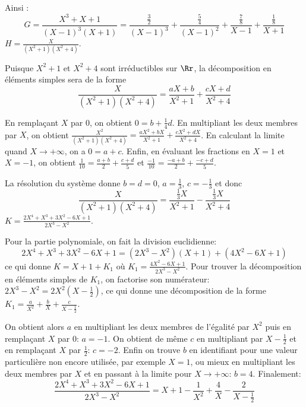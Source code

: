 {\begin{enumerate}
{Ainsi :
$$G = \frac{X^3+X+1}{(X-1)^3(X+1)} = \frac{\tfrac32}{(X-1)^3} + \frac{\tfrac54}{(X-1)^2} 
+ \frac{\tfrac78}{X-1}  + \frac{\tfrac18}{X+1}$$
$H=\frac{X}{(X^2+1)(X^2+4)}$.

Puisque $X^2+1$ et $X^2+4$ sont irréductibles sur $\Rr$, la décomposition en éléments simples sera de la forme 
$$\frac{X}{(X^2+1)(X^2+4)} = \frac{aX+b}{X^2+1} + \frac{cX+d}{X^2+4}$$

  \begin{itemize}
En remplaçant $X$ par $0$, on obtient $0=b+\frac{1}{4}d$.
En multipliant les deux membres par $X$, on obtient 
    $\frac{X^2}{(X^2+1)(X^2+4)} = \frac{aX^2+bX}{X^2+1} + \frac{cX^2+dX}{X^2+4}$.
    En calculant la limite quand $X\to +\infty$, on a $0=a+c$.
Enfin, en évaluant les fractions en $X=1$ et $X=-1$, 
    on obtient $\frac{1}{10}=\frac{a+b}{2}+\frac{c+d}{5}$ et 
    $\frac{-1}{10}=\frac{-a+b}{2}+\frac{-c+d}{5}$.
  \end{itemize}

La résolution du système donne $b=d=0$, $a=\frac{1}{3}$, $c=-\frac{1}{3}$ et donc 
$$\frac{X}{(X^2+1)(X^2+4)} = \frac{\frac{1}{3}X}{X^2+1} - \frac{\frac{1}{3}X}{X^2+4}$$
$K=\frac{2X^4+X^3+3X^2-6X+1}{2X^3-X^2}$.

Pour la partie polynomiale, on fait la division euclidienne:
$$2X^4+X^3+3X^2-6X+1=(2X^3-X^2)(X+1)+(4X^2-6X+1)$$ 
ce qui donne 
$K=X+1+K_1$ où $K_1=\frac{4X^2-6X+1}{2X^3-X^2}$.
Pour trouver la décomposition en éléments simples de $K_1$, on factorise son numérateur: 
$2X^3-X^2=2X^2(X-\frac{1}{2})$, ce qui donne une décomposition de la forme
$K_1=\frac{a}{X^2}+\frac{b}{X}+\frac{c}{X-\frac{1}{2}}$.

On obtient alors $a$ en multipliant les deux membres de l'égalité par
$X^2$ puis en remplaçant $X$ par 0: $a=-1$. On obtient de
m\^eme $c$ en multipliant par $X-\frac{1}{2}$ et en remplaçant $X$
par $\frac{1}{2}$: $c=-2$. Enfin on trouve $b$ en identifiant pour une
valeur particuli\`ere non encore utilisée, par exemple $X=1$, ou mieux en
multipliant les deux membres par $X$ et en passant \`a la limite pour
$X\to+\infty$: $b=4$. Finalement:
$$\frac{2X^4+X^3+3X^2-6X+1}{2X^3-X^2}=X+1-\frac{1}{X^2}+\frac{4}{X}-\frac{2}{X-\frac{1}{2}}$$
}
\end{enumerate}
}
